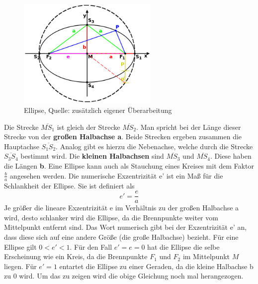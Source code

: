 \begin{figure}[h]                                                                           %
	\centering                                                                            	%
	\includegraphics[width=0.6\textwidth]{./images/ellipse_new.jpg}                         %
	\caption[Ellipse]{Ellipse, Quelle: \cite{Wiki:Elli} zusätzlich eigener Überarbeitung}          %
	\label{fig:ellipse}                                                                     %
\end{figure}                                                                              	%
Die Strecke \ensuremath{\overline{MS_{1}}} ist gleich der Strecke \ensuremath{\overline{MS_{2}}}. Man spricht bei der Länge dieser Strecke von der \textbf{großen Halbachse a}. Beide Strecken ergeben zusammen die Hauptachse \ensuremath{\overline{S_{1}S_{2}}}. Analog gibt es hierzu die Nebenachse, welche durch die Strecke \ensuremath{\overline{S_{3}S_{4}}} bestimmt wird. Die \textbf{kleinen Halbachsen} sind \ensuremath{\overline{MS_{3}}} und \ensuremath{\overline{MS_{4}}}. Diese haben die Längen \textbf{b}. Eine Ellipse kann auch als Stauchung eines Kreises mit dem Faktor \ensuremath{\frac{b}{a}} angesehen werden. 
\newpar
Die numerische Exzentrizität e' ist ein Maß für die Schlankheit der Ellipse. Sie ist definiert als
\begin{equation}
	e'=\frac{e}{a}
\end{equation}
Je größer die lineare Exzentrizität e im Verhältnis zu der großen Halbachse a wird, desto schlanker wird die Ellipse, da die Brennpunkte weiter vom Mittelpunkt entfernt sind. Das Wort numerisch gibt bei der Exzentrizität e' an, dass diese sich auf eine andere Größe (die große Halbachse) bezieht. Für eine Ellipse gilt \ensuremath{0 < e' < 1}. Für den Fall \ensuremath{e'=e=0} hat die Ellipse die selbe Erscheinung wie ein Kreis, da die Brennpunkte \ensuremath{F_1} und \ensuremath{F_2} im Mittelpunkt \ensuremath{M} liegen. Für \ensuremath{e'=1} entartet die Ellipse zu einer Geraden, da die kleine Halbachse b zu 0 wird. Um das zu zeigen wird die obige Gleichung noch mal herangezogen.
